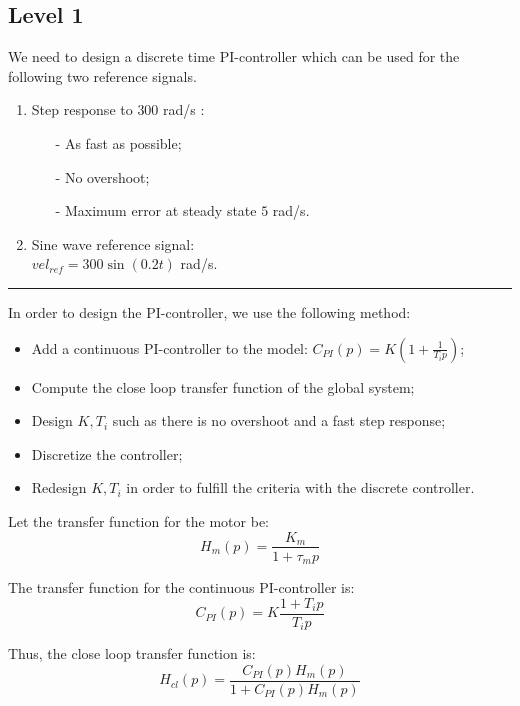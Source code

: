 
\subsection*{Level 1}

We need to design a discrete time PI-controller which can be used for the following two reference signals.

\begin{enumerate}
 \item Step response to $300$ rad/s :
 \begin{itemize}
  \item[-] As fast as possible;
  \item[-] No overshoot;
  \item[-] Maximum error at steady state $5$ rad/s.
 \end{itemize}
  \item Sine wave reference signal: \\ $vel_{ref} = 300 \sin(0.2t)$ rad/s.
\end{enumerate}

\begin{center} \noindent\rule{6cm}{0.1pt} \end{center}


In order to design the PI-controller, we use the following method:
\begin{itemize}
 \item Add a continuous PI-controller to the model: $C_{PI}(p) = K(1 + \frac{1}{T_i p})$;
 \item Compute the close loop transfer function of the global system;
 \item Design $K,T_i$ such as there is no overshoot and a fast step response;
 \item Discretize the controller;
 \item Redesign $K,T_i$ in order to fulfill the criteria with the discrete controller.
\end{itemize}

Let the transfer function for the motor be: $$H_{m}(p) = \frac{K_{m}}{1 + \tau_{m} p}$$

The transfer function for the continuous PI-controller is: $$C_{PI}(p) = K\frac{1 + T_i p}{T_i p}$$

Thus, the close loop transfer function is: \begin{equation} \label{eq1} H_{cl}(p) = \frac{C_{PI}(p) H_{m}(p)}{1 + C_{PI}(p) H_{m}(p)} \end{equation}

